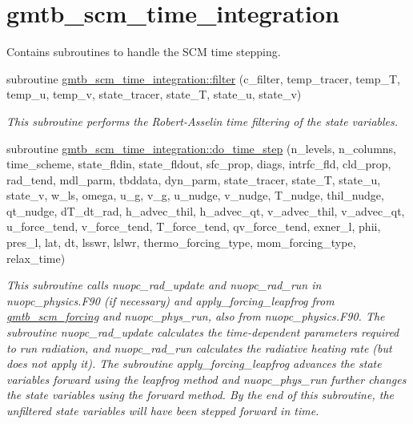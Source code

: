 \hypertarget{group__time__integration}{}\section{gmtb\+\_\+scm\+\_\+time\+\_\+integration}
\label{group__time__integration}


Contains subroutines to handle the S\+CM time stepping.  


\begin{DoxyCompactItemize}
\item 
subroutine \hyperlink{group__time__integration_gadc22247097920b209bb2c62f4dfe8f75}{gmtb\+\_\+scm\+\_\+time\+\_\+integration\+::filter} (c\+\_\+filter, temp\+\_\+tracer, temp\+\_\+T, temp\+\_\+u, temp\+\_\+v, state\+\_\+tracer, state\+\_\+T, state\+\_\+u, state\+\_\+v)
\begin{DoxyCompactList}\small\item\em This subroutine performs the Robert-\/\+Asselin time filtering of the state variables. \end{DoxyCompactList}\item 
subroutine \hyperlink{group__time__integration_ga32b72716e3e970874e9cb909ba66328d}{gmtb\+\_\+scm\+\_\+time\+\_\+integration\+::do\+\_\+time\+\_\+step} (n\+\_\+levels, n\+\_\+columns, time\+\_\+scheme, state\+\_\+fldin, state\+\_\+fldout, sfc\+\_\+prop, diags, intrfc\+\_\+fld, cld\+\_\+prop,   rad\+\_\+tend, mdl\+\_\+parm, tbddata, dyn\+\_\+parm, state\+\_\+tracer, state\+\_\+T, state\+\_\+u, state\+\_\+v, w\+\_\+ls, omega, u\+\_\+g, v\+\_\+g, u\+\_\+nudge, v\+\_\+nudge, T\+\_\+nudge, thil\+\_\+nudge, qt\+\_\+nudge, d\+T\+\_\+dt\+\_\+rad, h\+\_\+advec\+\_\+thil, h\+\_\+advec\+\_\+qt, v\+\_\+advec\+\_\+thil, v\+\_\+advec\+\_\+qt, u\+\_\+force\+\_\+tend, v\+\_\+force\+\_\+tend, T\+\_\+force\+\_\+tend,   qv\+\_\+force\+\_\+tend, exner\+\_\+l, phii, pres\+\_\+l, lat, dt, lsswr, lslwr, thermo\+\_\+forcing\+\_\+type, mom\+\_\+forcing\+\_\+type, relax\+\_\+time)
\begin{DoxyCompactList}\small\item\em This subroutine calls nuopc\+\_\+rad\+\_\+update and nuopc\+\_\+rad\+\_\+run in nuopc\+\_\+physics.\+F90 (if necessary) and apply\+\_\+forcing\+\_\+leapfrog from \hyperlink{group__forcing}{gmtb\+\_\+scm\+\_\+forcing} and nuopc\+\_\+phys\+\_\+run, also from nuopc\+\_\+physics.\+F90. The subroutine nuopc\+\_\+rad\+\_\+update calculates the time-\/dependent parameters required to run radiation, and nuopc\+\_\+rad\+\_\+run calculates the radiative heating rate (but does not apply it). The subroutine apply\+\_\+forcing\+\_\+leapfrog advances the state variables forward using the leapfrog method and nuopc\+\_\+phys\+\_\+run further changes the state variables using the forward method. By the end of this subroutine, the unfiltered state variables will have been stepped forward in time. \end{DoxyCompactList}\end{DoxyCompactItemize}


